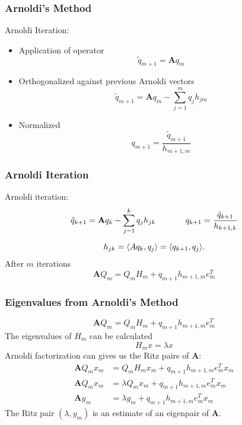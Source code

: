 \documentclass[color={usenames, dvipsnames},ignorenonframetext]{beamer}
\newcommand{\A}{\mathbf{A}}
\begin{document}
\begin{frame}
    \frametitle{Arnoldi's Method}
    Arnoldi Iteration:
    \begin{itemize}
        \item Application of operator
        \begin{equation*}
            \tilde{q}_{m+1} = \A q_m
        \end{equation*}
        \item Orthogonalized against previous Arnoldi vectors
        \begin{equation*}
            \tilde{q}_{m+1} = \A q_m - \sum_{j=1}^m q_j h_{jm}
        \end{equation*}
        \item Normalized
        \begin{equation*}
            q_{m+1} = \frac{\tilde{q}_{m+1}}{h_{m+1,m}}
        \end{equation*}
    \end{itemize}
\end{frame}

\begin{frame}
    \frametitle{Arnoldi Iteration}
    Arnoldi iteration:
    \begin{gather*}
        \tilde{q}_{k+1} = \A q_k - \sum_{j=1}^k q_j h_{jk} \hspace{0.5in} q_{k+1} = \frac{\tilde{q}_{k+1}}{h_{k+1,k}} \\[2mm]
        h_{jk} = \langle Aq_k, q_j \rangle = \langle q_{k+1}, q_j \rangle.
    \end{gather*}
    \pause
    After $m$ iterations
    \begin{equation*}
        \A Q_m = Q_{m}H_{m} + q_{m+1}h_{m+1,m}e_m^T
    \end{equation*}
\end{frame}
\begin{frame}
    \frametitle{Eigenvalues from Arnoldi's Method}
    \begin{equation*}
        \A Q_m = Q_{m}H_{m} + q_{m+1}h_{m+1,m}e_m^T
    \end{equation*}
    The eigenvalues of $H_m$ can be calculated
    \begin{equation*}
        H_m x = \lambda x
    \end{equation*}
    \pause
    Arnoldi factorization can gives us the Ritz pairs of $\A$:
    \begin{subequations}\begin{align*}
        \A Q_mx_m &= Q_{m}H_{m}x_m + q_{m+1}h_{m+1,m}e_m^Tx_m \\[2mm]
        \A Q_mx_m &= \lambda Q_{m}x_m + q_{m+1}h_{m+1,m}e_m^Tx_m \\[2mm]
        \A y_m &= \lambda y_m + q_{m+1}h_{m+1,m}e_m^Tx_m
    \end{align*}\end{subequations}
    \pause
    The Ritz pair $\left(\lambda, y_m\right)$ is an estimate of an eigenpair of $\A$.
\end{frame}
\end{document}
